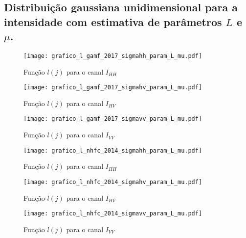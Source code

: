 \subsection{Distribuição gaussiana unidimensional para a intensidade com estimativa de parâmetros $L$ e $\mu$.}
\begin{figure}[hbt]
  \texttt{[image: grafico\_l\_gamf\_2017\_sigmahh\_param\_L\_mu.pdf]}
	\caption{Função $l(j)$ para o canal $I_{HH}$}\label{cap_acf_fig04}
\endminipage\hfill
{}
  \texttt{[image: grafico\_l\_gamf\_2017\_sigmahv\_param\_L\_mu.pdf]}
	\caption{Função $l(j)$ para o canal $I_{HV}$}\label{cap_acf_fig05}
\endminipage\hfill
\centering
{}
  \texttt{[image: grafico\_l\_gamf\_2017\_sigmavv\_param\_L\_mu.pdf]}
	\caption{Função $l(j)$ para o canal $I_{VV}$}\label{cap_acf_fig06}
\endminipage\hfill
\end{figure}

\begin{figure}[hbt]
  \texttt{[image: grafico\_l\_nhfc\_2014\_sigmahh\_param\_L\_mu.pdf]}
	\caption{Função $l(j)$ para o canal $I_{HH}$}\label{cap_acf_fig04}
\endminipage\hfill
{}
  \texttt{[image: grafico\_l\_nhfc\_2014\_sigmahv\_param\_L\_mu.pdf]}
	\caption{Função $l(j)$ para o canal $I_{HV}$}\label{cap_acf_fig05}
\endminipage\hfill
\centering
{}
  \texttt{[image: grafico\_l\_nhfc\_2014\_sigmavv\_param\_L\_mu.pdf]}
	\caption{Função $l(j)$ para o canal $I_{VV}$}\label{cap_acf_fig06}
\endminipage\hfill
\end{figure}


